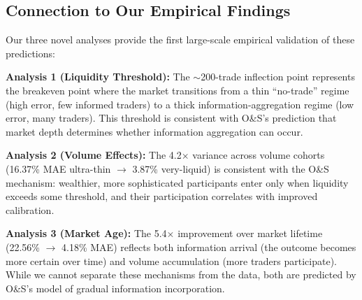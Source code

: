 \documentclass[12pt,letterpaper]{article}
\begin{document}
\subsection{Connection to Our Empirical Findings}

Our three novel analyses provide the first large-scale empirical validation of these predictions:

\textbf{Analysis 1 (Liquidity Threshold):} The $\sim$200-trade inflection point represents the breakeven point where the market transitions from a thin ``no-trade'' regime (high error, few informed traders) to a thick information-aggregation regime (low error, many traders). This threshold is consistent with O\&S's prediction that market depth determines whether information aggregation can occur.

\textbf{Analysis 2 (Volume Effects):} The 4.2$\times$ variance across volume cohorts (16.37\% MAE ultra-thin $\rightarrow$ 3.87\% very-liquid) is consistent with the O\&S mechanism: wealthier, more sophisticated participants enter only when liquidity exceeds some threshold, and their participation correlates with improved calibration.

\textbf{Analysis 3 (Market Age):} The 5.4$\times$ improvement over market lifetime (22.56\% $\rightarrow$ 4.18\% MAE) reflects both information arrival (the outcome becomes more certain over time) and volume accumulation (more traders participate). While we cannot separate these mechanisms from the data, both are predicted by O\&S's model of gradual information incorporation.
\end{document}
